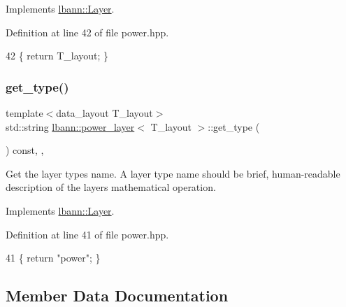 Implements \hyperlink{classlbann_1_1Layer_a5dfb66e81fc085997402a5e2241316bd}{lbann\+::\+Layer}.



Definition at line 42 of file power.\+hpp.


\begin{DoxyCode}
42 \{ \textcolor{keywordflow}{return} T\_layout; \}
\end{DoxyCode}
\mbox{\label{classlbann_1_1power__layer_ab92cf57b093aea946fe60369226ac80a}} 
\subsubsection{\texorpdfstring{get\+\_\+type()}{get\_type()}}
{\footnotesize\ttfamily template$<$data\+\_\+layout T\+\_\+layout$>$ \\
std\+::string \hyperlink{classlbann_1_1power__layer}{lbann\+::power\+\_\+layer}$<$ T\+\_\+layout $>$\+::get\+\_\+type (\begin{DoxyParamCaption}{ }\end{DoxyParamCaption}) const\hspace{0.3cm}{\ttfamily [inline]}, {\ttfamily [override]}, {\ttfamily [virtual]}}

Get the layer type\textquotesingle{}s name. A layer type name should be brief, human-\/readable description of the layer\textquotesingle{}s mathematical operation. 

Implements \hyperlink{classlbann_1_1Layer_a0fa0ea9160b490c151c0a17fde4f7239}{lbann\+::\+Layer}.



Definition at line 41 of file power.\+hpp.


\begin{DoxyCode}
41 \{ \textcolor{keywordflow}{return} \textcolor{stringliteral}{"power"}; \}
\end{DoxyCode}


\subsection{Member Data Documentation}
\mbox{\label{classlbann_1_1power__layer_a778b995d25e24f5c82ab85cfeab2ee41}} 
